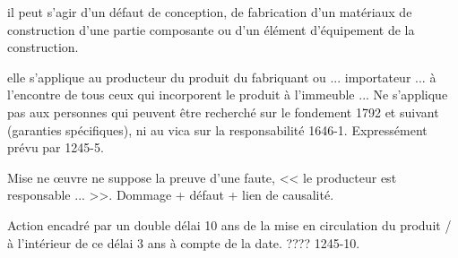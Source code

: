 			il peut s'agir d'un défaut de conception, de fabrication d'un matériaux de construction  d'une partie composante ou d'un élément d'équipement de la construction.

			elle s'applique au producteur du produit \cad du fabriquant ou ... importateur ... à l'encontre de tous ceux qui incorporent le produit à l'immeuble ... Ne s'applique pas aux personnes qui peuvent être recherché sur le fondement 1792 et suivant (garanties spécifiques), ni au vica sur la responsabilité 1646-1. Expressément prévu par 1245-5.

			Mise ne œuvre ne suppose la preuve d'une faute, << le producteur est responsable ... >>. Dommage + défaut + lien de causalité.

			Action encadré par un double délai 10 ans de la mise en circulation du produit / à l'intérieur de ce délai 3 ans à compte de la date. ???? 1245-10.
